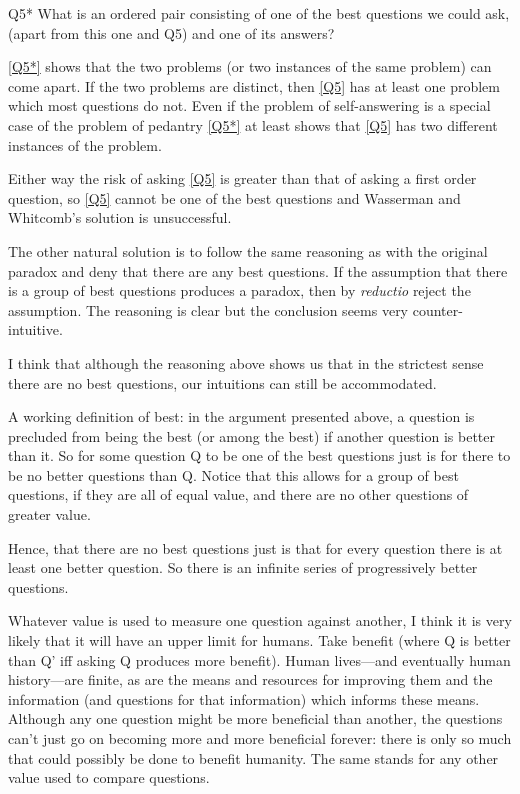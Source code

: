 	\begin{principle}{Q5*}\label{Q5*}
	What is an ordered pair consisting of one of the best questions we could ask, (apart from this one and Q5) and one of its answers?
	\end{principle}

\ref{Q5*} shows that the two problems (or two instances of the same problem) can come apart.
If the two problems are distinct, then \ref{Q5} has at least one problem which most questions do not.
Even if the problem of self-answering is a special case of the problem of pedantry \ref{Q5*} at least shows that \ref{Q5} has two different instances of the problem.

Either way the risk of asking \ref{Q5} is greater than that of asking a first order question, so \ref{Q5} cannot be one of the best questions and Wasserman and Whitcomb's solution is unsuccessful.

The other natural solution is to follow the same reasoning as with the original paradox and deny that there are any best questions.
If the assumption that there is a group of best questions produces a paradox, then by \textit{reductio} reject the assumption.
The reasoning is clear but the conclusion seems very counter-intuitive.

I think that although the reasoning above shows us that in the strictest sense there are no best questions, our intuitions can still be accommodated.

A working definition of best: in the argument presented above, a question is precluded from being the best (or among the best) if another question is better than it.
So for some question Q to be one of the best questions just is for there to be no better questions than Q.
Notice that this allows for a group of best questions, if they are all of equal value, and there are no other questions of greater value.

Hence, that there are no best questions just is that for every question there is at least one better question.
So there is an infinite series of progressively better questions.

Whatever value is used to measure one question against another, I think it is very likely that it will have an upper limit for humans.
Take benefit (where Q is better than Q' iff asking Q produces more benefit).
Human lives---and eventually human history---are finite, as are the means and resources for improving them and the information (and questions for that information) which informs these means.
Although any one question might be more beneficial than another, the questions can't just go on becoming more and more beneficial forever: there is only so much that could possibly be done to benefit humanity.
The same stands for any other value used to compare questions.

